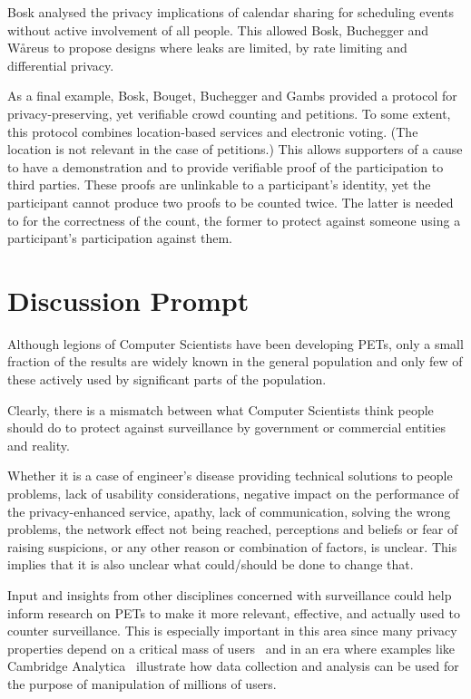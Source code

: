 Bosk analysed the privacy implications of calendar sharing for scheduling 
events without active involvement of all people.
This allowed Bosk, Buchegger and Wåreus to propose designs where leaks are 
limited, \eg by rate limiting and differential privacy.

As a final example, Bosk, Bouget, Buchegger and Gambs provided a protocol for 
privacy-preserving, yet verifiable crowd counting and petitions.
To some extent, this protocol combines location-based services and electronic 
voting.
(The location is not relevant in the case of petitions.)
This allows supporters of a cause to have a demonstration and to provide 
verifiable proof of the participation to third parties.
These proofs are unlinkable to a participant's identity, yet the participant 
cannot produce two proofs to be counted twice.
The latter is needed to for the correctness of the count, the former to protect 
against someone using a participant's participation against them.


\section{Discussion Prompt}

Although legions of Computer Scientists have been developing
\acp{PET}, only a small fraction of the results are widely known in
the general population and only few of these actively used by
significant parts of the population. 

Clearly, there is a mismatch between what Computer Scientists think
people should do to protect against surveillance by government or
commercial entities and reality.

Whether it is a case of engineer's disease providing technical
solutions to people problems, lack of usability considerations,
negative impact on the performance of the privacy-enhanced service,
apathy, lack of communication, solving the wrong problems, the network
effect not being reached, perceptions and beliefs or fear of raising
suspicions, or any other reason or combination of factors, is
unclear. This implies that it is also unclear what could/should be
done to change that.

Input and insights from other disciplines concerned with surveillance
could help inform research on \acp{PET} to make it more relevant,
effective, and actually used to counter surveillance. This is
especially important in this area since many privacy properties depend
on a critical mass of users~\cite{AnonymityLovesCompany} and in an era
where examples like Cambridge 
Analytica~\cite{%
  cambridge-analytica-wired,
  cambridge-analytica-guardian,
  cambridge-analytica-nytimes,
  cambridge-analytica-wp%
} illustrate how data collection and analysis can be used for the
purpose of manipulation of millions of users. 



